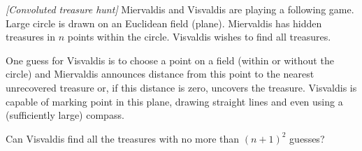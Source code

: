 %
%
%
%
%
%
%
%
%
%
%

\begin{problem}
\textit{[Convoluted treasure hunt]}
Miervaldis and Visvaldis are playing a following game. Large circle is drawn on an Euclidean field (plane). Miervaldis has hidden treasures in $n$ points within the circle. Visvaldis wishes to find all treasures.

One guess for Visvaldis is to choose a point on a field (within or without the circle) and Miervaldis announces distance from this point to the nearest unrecovered treasure or, if this distance is zero, uncovers the treasure. Visvaldis is capable of marking point in this plane, drawing straight lines and even using a (sufficiently large) compass.

Can Visvaldis find all the treasures with no more than $(n+1)^2$ guesses? 
\end{problem}
%

